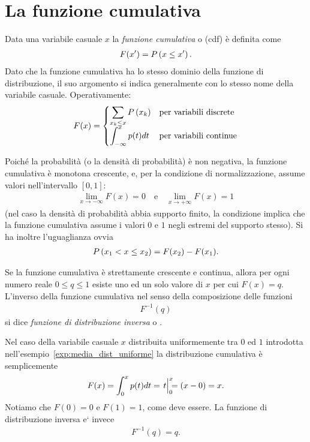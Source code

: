 \section{La funzione cumulativa}
\label{sec:funzione_cumulativa}

Data una variabile casuale $x$ la \emph{funzione cumulativa} o
 (cdf) è definita come
\begin{align}
  F(x') = \displaystyle P\left(x \leq x'\right).
\end{align}
Dato che la funzione cumulativa ha lo stesso dominio della funzione di
distribuzione, il suo argomento si indica generalmente con lo stesso nome
della variabile casuale. Operativamente:
\begin{align}
  \dccases{F(x)}{\sum_{x_k \leq x}\prob{x_k}}{\int_{-\infty}^x p(t) dt}
\end{align}

Poiché la probabilità (o la densità di probabilità) è non negativa,
la funzione cumulativa è monotona crescente, e, per la condizione di
normalizzazione, assume valori nell'intervallo $[0, 1]$:
\begin{align}
  \lim_{x \rightarrow -\infty}F(x) = 0 \quad \text{e} \quad
  \lim_{x \rightarrow +\infty}F(x) = 1
\end{align}
(nel caso la densità di probabilità abbia supporto finito, la condizione
implica che la funzione cumulativa assume i valori $0$ e $1$ negli estremi del
supporto stesso). Si ha inoltre l'uguaglianza ovvia
\begin{align}
  \displaystyle P\left(x_1 < x \leq x_2\right) = F(x_2) - F(x_1).
\end{align}

Se la funzione cumulativa è strettamente crescente e continua, allora
per ogni numero reale $0 \leq q \leq 1$ esiste uno ed un solo valore di
$x$ per cui $F(x) = q$. L'inverso della funzione cumulativa nel senso della
composizione delle funzioni
\begin{align}
  F^{-1}(q)
\end{align}
si dice \emph{funzione di distribuzione inversa} o
.

\begin{examplebox}
  \begin{example}
    Nel caso della variabile casuale $x$ distribuita uniformemente tra $0$ ed
    $1$ introdotta nell'esempio~\ref{exp:media_dist_uniforme} la distribuzione
    cumulativa è semplicemente
    \begin{align*}
      F(x) = \int_0^x p(t) dt = \eval{t\rule{0pt}{10pt}}{0}{x} = (x - 0) = x.
    \end{align*}
    Notiamo che $F(0) = 0$ e $F(1) = 1$, come deve essere. La funzione di
    distribuzione inversa e` invece
    \begin{align*}
      F^{-1}(q) = q.
    \end{align*}
  \end{example}
\end{examplebox}


